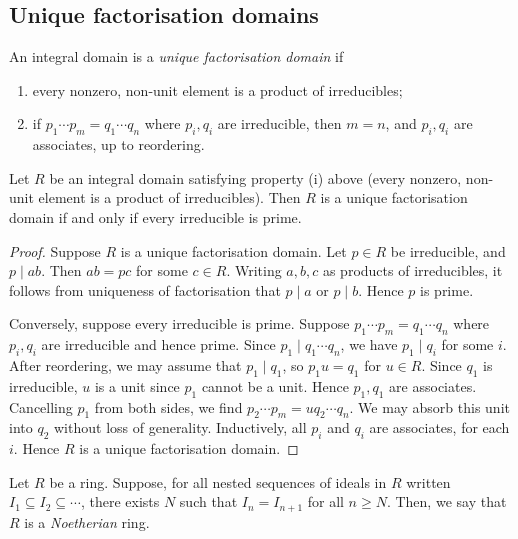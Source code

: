 \subsection{Unique factorisation domains}
\begin{definition}
	An integral domain is a \textit{unique factorisation domain} if
	\begin{enumerate}
		\item every nonzero, non-unit element is a product of irreducibles;
		\item if \( p_1 \cdots p_m = q_1 \cdots q_n \) where \( p_i, q_i \) are irreducible, then \( m = n \), and \( p_i, q_i \) are associates, up to reordering.
	\end{enumerate}
\end{definition}
\begin{proposition}
	Let \( R \) be an integral domain satisfying property (i) above (every nonzero, non-unit element is a product of irreducibles).
	Then \( R \) is a unique factorisation domain if and only if every irreducible is prime.
\end{proposition}
\begin{proof}
	Suppose \( R \) is a unique factorisation domain.
	Let \( p \in R \) be irreducible, and \( p \mid ab \).
	Then \( ab = pc \) for some \( c \in R \).
	Writing \( a, b, c \) as products of irreducibles, it follows from uniqueness of factorisation that \( p \mid a \) or \( p \mid b \).
	Hence \( p \) is prime.

	Conversely, suppose every irreducible is prime.
	Suppose \( p_1 \cdots p_m = q_1 \cdots q_n \) where \( p_i, q_i \) are irreducible and hence prime.
	Since \( p_1 \mid q_1 \cdots q_n \), we have \( p_1 \mid q_i \) for some \( i \).
	After reordering, we may assume that \( p_1 \mid q_1 \), so \( p_1 u = q_1 \) for \( u \in R \).
	Since \( q_1 \) is irreducible, \( u \) is a unit since \( p_1 \) cannot be a unit.
	Hence \( p_1, q_1 \) are associates.
	Cancelling \( p_1 \) from both sides, we find \( p_2 \cdots p_m = u q_2 \cdots q_n \).
	We may absorb this unit into \( q_2 \) without loss of generality.
	Inductively, all \( p_i \) and \( q_i \) are associates, for each \( i \).
	Hence \( R \) is a unique factorisation domain.
\end{proof}
\begin{definition}
	Let \( R \) be a ring.
	Suppose, for all nested sequences of ideals in \( R \) written \( I_1 \subseteq I_2 \subseteq \cdots \), there exists \( N \) such that \( I_n = I_{n+1} \) for all \( n \geq N \).
	Then, we say that \( R \) is a \textit{Noetherian} ring.
\end{definition}
